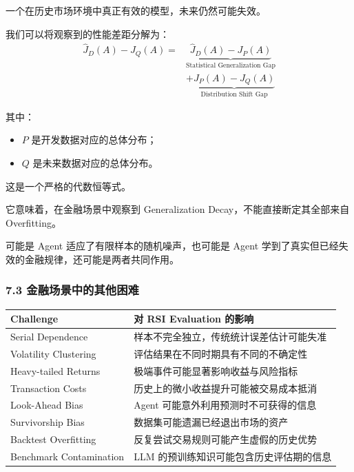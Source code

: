 一个在历史市场环境中真正有效的模型，未来仍然可能失效。

我们可以将观察到的性能差距分解为：
\[\boxed{
\begin{aligned}
\widehat J_D(A)-J_Q(A)
={}&
\underbrace{
\widehat J_D(A)-J_P(A)
}_{\text{Statistical Generalization Gap}}\\
&+
\underbrace{
J_P(A)-J_Q(A)
}_{\text{Distribution Shift Gap}}
\end{aligned}
}\]

其中：

\begin{itemize}
\tightlist
\item
  \(P\) 是开发数据对应的总体分布；
\item
  \(Q\) 是未来数据对应的总体分布。
\end{itemize}

这是一个严格的代数恒等式。

它意味着，在金融场景中观察到 Generalization Decay，不能直接断定其全部来自 Overfitting。

可能是 Agent 适应了有限样本的随机噪声，也可能是 Agent 学到了真实但已经失效的金融规律，还可能是两者共同作用。

\hypertarget{part-1-07-0001-ux91d1ux878dux573aux666fux4e2dux7684ux5176ux4ed6ux56f0ux96be}{%
\subsubsection{7.3 金融场景中的其他困难}\label{part-1-07-0001-ux91d1ux878dux573aux666fux4e2dux7684ux5176ux4ed6ux56f0ux96be}}

\begin{readertable}
\begin{longtable}[]{@{}
  >{\raggedright\arraybackslash}p{}
  >{\raggedright\arraybackslash}p{}@{}}
\toprule
Challenge & 对 RSI Evaluation 的影响 \\
\midrule
\endhead
Serial Dependence & 样本不完全独立，传统统计误差估计可能失准 \\
Volatility Clustering & 评估结果在不同时期具有不同的不确定性 \\
Heavy-tailed Returns & 极端事件可能显著影响收益与风险指标 \\
Transaction Costs & 历史上的微小收益提升可能被交易成本抵消 \\
Look-Ahead Bias & Agent 可能意外利用预测时不可获得的信息 \\
Survivorship Bias & 数据集可能遗漏已经退出市场的资产 \\
Backtest Overfitting & 反复尝试交易规则可能产生虚假的历史优势 \\
Benchmark Contamination & LLM 的预训练知识可能包含历史评估期的信息 \\
\bottomrule
\end{longtable}
\end{readertable}


